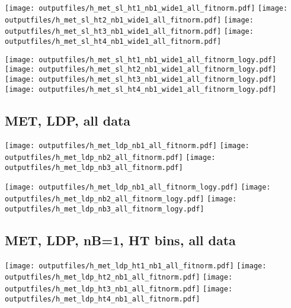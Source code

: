 \documentclass[11pt]{article}
\begin{document}
    \noindent
     \texttt{[image: outputfiles/h\_met\_sl\_ht1\_nb1\_wide1\_all\_fitnorm.pdf]}
     \texttt{[image: outputfiles/h\_met\_sl\_ht2\_nb1\_wide1\_all\_fitnorm.pdf]}
     \texttt{[image: outputfiles/h\_met\_sl\_ht3\_nb1\_wide1\_all\_fitnorm.pdf]}
     \texttt{[image: outputfiles/h\_met\_sl\_ht4\_nb1\_wide1\_all\_fitnorm.pdf]}

    \noindent
     \texttt{[image: outputfiles/h\_met\_sl\_ht1\_nb1\_wide1\_all\_fitnorm\_logy.pdf]}
     \texttt{[image: outputfiles/h\_met\_sl\_ht2\_nb1\_wide1\_all\_fitnorm\_logy.pdf]}
     \texttt{[image: outputfiles/h\_met\_sl\_ht3\_nb1\_wide1\_all\_fitnorm\_logy.pdf]}
     \texttt{[image: outputfiles/h\_met\_sl\_ht4\_nb1\_wide1\_all\_fitnorm\_logy.pdf]}


     \clearpage


    \subsection{ MET, LDP, all data}

    \noindent
     \texttt{[image: outputfiles/h\_met\_ldp\_nb1\_all\_fitnorm.pdf]}
     \texttt{[image: outputfiles/h\_met\_ldp\_nb2\_all\_fitnorm.pdf]}
     \texttt{[image: outputfiles/h\_met\_ldp\_nb3\_all\_fitnorm.pdf]}

    \noindent
     \texttt{[image: outputfiles/h\_met\_ldp\_nb1\_all\_fitnorm\_logy.pdf]}
     \texttt{[image: outputfiles/h\_met\_ldp\_nb2\_all\_fitnorm\_logy.pdf]}
     \texttt{[image: outputfiles/h\_met\_ldp\_nb3\_all\_fitnorm\_logy.pdf]}


     \subsection{ MET, LDP, nB=1, HT bins, all data}

    \noindent
     \texttt{[image: outputfiles/h\_met\_ldp\_ht1\_nb1\_all\_fitnorm.pdf]}
     \texttt{[image: outputfiles/h\_met\_ldp\_ht2\_nb1\_all\_fitnorm.pdf]}
     \texttt{[image: outputfiles/h\_met\_ldp\_ht3\_nb1\_all\_fitnorm.pdf]}
     \texttt{[image: outputfiles/h\_met\_ldp\_ht4\_nb1\_all\_fitnorm.pdf]}
\end{document}
